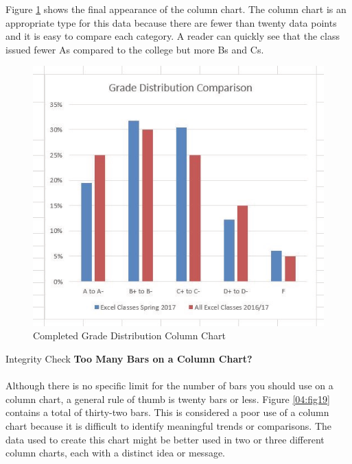 Figure \ref{04:fig18} shows the final appearance of the column chart. The column chart is an appropriate type for this data because there are fewer than twenty data points and it is easy to compare each category. A reader can quickly see that the class issued fewer As compared to the college but more Bs and Cs.

\begin{figure}[H]
	\centering
	\includegraphics[width=\maxwidth{.95\linewidth}]{gfx/ch04_fig18}
	\caption{Completed Grade Distribution Column Chart}
	\label{04:fig18}
\end{figure}

\begin{center}
	\begin{infobox}{Integrity Check}
		\textbf{Too Many Bars on a Column Chart?}
		\\
		\\
		 Although there is no specific limit for the number of bars you should use on a column chart, a general rule of thumb is twenty bars or less. Figure \ref{04:fig19} contains a total of thirty-two bars. This is considered a poor use of a column chart because it is difficult to identify meaningful trends or comparisons. The data used to create this chart might be better used in two or three different column charts, each with a distinct idea or message.
	\end{infobox}
\end{center}

